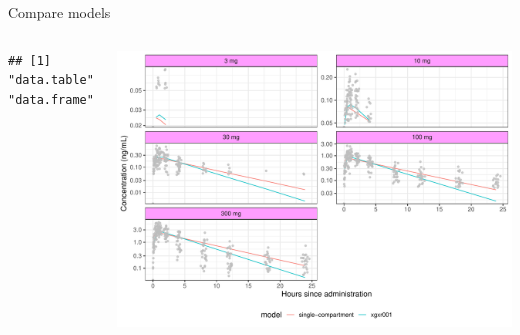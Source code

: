 \documentclass[
  8pt,
  ignorenonframetext,
  aspectratio=169]{beamer}
\begin{document}
\begin{frame}[fragile]{Compare models}
\begin{columns}[T]
\begin{column}{0.45\textwidth}
\begin{verbatim}
## [1] "data.table" "data.frame"
\end{verbatim}
\end{column}

\begin{column}{0.55\textwidth}
\normalsize

\begin{center}\includegraphics{plots/comparemodels-plot-1} \end{center}
\end{column}
\end{columns}
\end{frame}
\end{document}
